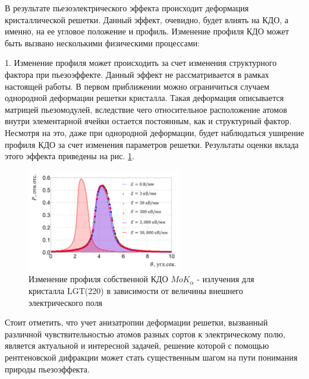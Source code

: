 В результате пьезоэлектрического эффекта происходит деформация
кристаллической решетки. Данный эффект, очевидно, будет влиять на
КДО, а именно, на ее угловое положение и профиль.
Изменение профиля КДО может быть вызвано несколькими физическими процессами:

1. Изменение профиля может происходить за счет изменения структурного фактора при
пьезоэффекте. Данный эффект не рассматривается в рамках настоящей работы.
В первом приближении можно ограничиться случаем однородной деформации решетки
 кристалла. Такая деформация описывается
 матрицей пьезомодулей, вследствие чего относительное расположение атомов
 внутри элементарной ячейки остается постоянным, как и структурный фактор.
 Несмотря на это, даже при однородной деформации, будет наблюдаться
 уширение профиля КДО за счет изменения параметров решетки. Результаты оценки
  вклада этого эффекта приведены на рис. \ref{ris:self_kdo_deformation}.

 \begin{figure}[H]
   \centering
   \includegraphics[width=0.6\textwidth]{images/self_kdo_under_ex_field.png}
   \caption{Изменение профиля собственной КДО $MoK_{\alpha}$ - излучения
   для кристалла LGT(220)
   в зависимости от величины внешнего электрического поля }
   \label{ris:self_kdo_deformation}
 \end{figure}

Стоит отметить, что учет анизатропии деформации решетки, вызванный различной чувствительностью
атомов разных сортов к электрическому полю, является актуальной и интересной задачей,
решение которой с помощью рентгеновской дифракции может стать существенным шагом
на пути понимания природы пьезоэффекта.

